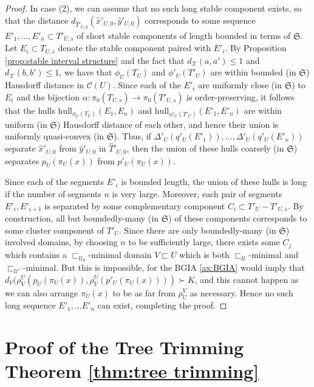 \documentclass{amsart}
\theoremstyle{definition}
\theoremstyle{remark}
\theoremstyle{definition}
\newcommand{\calC}{\mathcal{C}}
\newcommand{\calU}{\mathcal{U}}
\newcommand{\calX}{\mathcal{X}}
\newcommand{\hT}{\widehat{T}}
\newcommand{\hx}{\hat{x}}
\newcommand{\hy}{\hat{y}}
\newcommand{\hull}{\mathrm{hull}}
\newcommand{\nest}{\sqsubset}
\begin{document}
\begin{proof}
In case (2), we can assume that no such long stable component exists, so that the distance $d_{\hT'_{U,0}}(\hx'_{U,0}, \hy'_{U,0})$ corresponds to some sequence $E'_1, \dots, E'_n \subset T'_{U,s}$ of short stable components of length bounded in terms of $\mathfrak S$.  Let $E_i \subset T_{U,s}$ denote the stable component paired with $E'_i$.  By Proposition \ref{prop:stable interval structure} and the fact that $d_{\calX}(a,a') \leq 1$ and $d_{\calX}(b,b')\leq 1$, we have that $\phi_U(T_U)$ and $\phi'_U(T'_U)$ are within bounded (in $\mathfrak S$) Hausdorff distance in $\calC(U)$.  Since each of the $E'_i$ are uniformly close (in $\mathfrak S$) to $E_i$ and the bijection $\alpha:\pi_0(T_{U,s}) \to \pi_0(T'_{U,s})$ is order-preserving, it follows that the hulls $\hull_{\phi_U(T_U)}(E_1, E_n)$ and $\hull_{\phi'_U(T'_U)}(E'_1,E'_n)$ are within uniform (in $\mathfrak S$) Hausdorff distance of each other, and hence their union is uniformly quasi-convex (in $\mathfrak S$).  Thus, if $\Delta'_U(q'_U(E'_1)), \dots, \Delta'_U(q'_U(E'_n))$ separate $\hx'_{U,0}$ from $\hy'_{U,0}$ in $\hT'_{U,0}$, then the union of these hulls coarsely (in $\mathfrak S$) separates $p_U(\pi_U(x))$ from $p'_U(\pi_U(x))$.

Since each of the segments $E'_i$ is bounded length, the union of these hulls is long if the number of segments $n$ is very large.  Moreover, each pair of segments $E'_i, E'_{i+1}$ is separated by some complementary component $C_i \subset T'_U - T'_{U,s}$.  By construction, all but boundedly-many (in $\mathfrak S$) of these components corresponds to some cluster component of $T'_U$.  Since there are only boundedly-many (in $\mathfrak S$) involved domains, by choosing $n$ to be sufficiently large, there exists some $C_j$ which contains a $\nest_{\calU_0}$-minimal domain $V \nest U$ which is both $\nest_{\calU}$-minimal and $\nest_{\calU'}$-minimal.  But this is impossible, for the BGIA \ref{ax:BGIA} would imply that $d_V(\rho^U_V(p_U(\pi_U(x)), \rho^U_V(p'_U(\pi_U(x)))) \succ K$, and this cannot happen as we can also arrange $\pi_U(x)$ to be as far from $\rho^V_U$ as necessary.  Hence no such long sequence $E'_1, \dots E'_n$ can exist, completing the proof.



\end{proof}



\appendix
\section{Proof of the Tree Trimming Theorem \ref{thm:tree trimming}}\label{app:TT}
\end{document}

